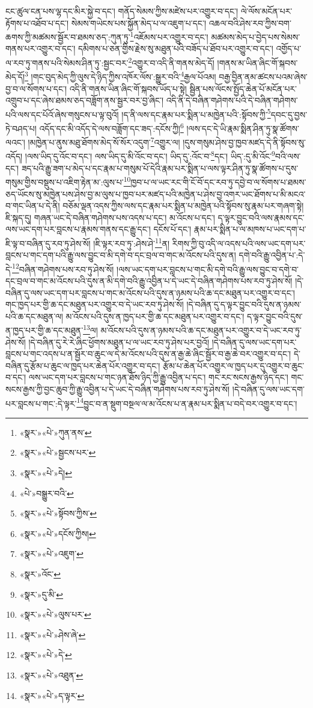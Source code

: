 ངང་ཚུལ་ངན་པས་ལྷ་དང་མིར་སྐྱེ་བ་དང་། གནོད་སེམས་ཀྱིས་མཛེས་པར་འགྱུར་བ་དང་། ལེ་ལོས་མངོན་པར་རྟོགས་པ་འཐོབ་པ་དང་། སེམས་གཡེངས་པས་སྐྱོན་མེད་པ་ལ་འཇུག་པ་དང་། འཆལ་བའི་ཤེས་རབ་ཀྱིས་བག་ཆགས་ཀྱི་མཚམས་སྦྱོར་བ་ཐམས་ཅད་:ཀུན་ཏུ་\footnote{«སྣར་»«པེ་»ཀུན་ནས་}འཇོམས་པར་འགྱུར་བ་དང་། མཚམས་མེད་པ་བྱེད་པས་སེམས་གནས་པར་འགྱུར་བ་དང་། དམིགས་པ་ཅན་གྱིས་རྗེས་སུ་མཐུན་པའི་བཟོད་པ་ཐོབ་པར་འགྱུར་བ་དང་། འགྱོད་པ་ལ་རབ་ཏུ་གནས་པའི་སེམས་ཤིན་ཏུ་:སྦྱང་བར་\footnote{«སྣར་»«པེ་»སྦྱངས་པར་}འགྱུར་བ་འདི་ནི་གནས་མེད་དོ། །གནས་མ་ཡིན་ཞིང་གོ་སྐབས་མེད་དོ།\footnote{«སྣར་»«པེ་»དེ།} །གང་བུད་མེད་ཀྱི་ལུས་དེ་ཉིད་ཀྱིས་འཁོར་ལོས་:སྒྱུར་བའི་\footnote{«པེ་»བསྒྱུར་བའི་}རྒྱལ་པོའམ། བརྒྱ་བྱིན་ནམ་ཚངས་པའམ་ཞེས་བྱ་བ་ལ་སོགས་པ་དང་། འདི་ནི་གནས་ཡིན་ཞིང་གོ་སྐབས་ཡོད་པ་སྟེ། སྦྱིན་པས་ལོངས་སྤྱོད་ཆེན་པོ་མངོན་པར་འགྲུབ་པ་དང་ཞེས་ཐམས་ཅད་བཟློག་ནས་སྦྱར་བར་བྱ་ཞིང་། འདི་ནི་དེ་བཞིན་གཤེགས་པའི་དེ་བཞིན་གཤེགས་པའི་ལས་དང་པོའོ་ཞེས་གསུངས་པ་ལྟ་བུའོ། །ད་ནི་ལས་དང་རྣམ་པར་སྨིན་པ་མཁྱེན་པའི་:སྟོབས་ཀྱི་\footnote{«སྣར་»«པེ་»སྟོབས་ཀྱིས་}དབང་དུ་བྱས་ཏེ་བཤད་པ། འདོད་དང་མི་འདོད་དེ་ལས་བཟློག་དང་ཟད་:དངོས་ཀྱི།\footnote{«སྣར་»«པེ་»དངོས་ཀྱིས།} །ལས་དང་དེ་ཡི་རྣམ་སྨིན་ཤིན་ཏུ་སྣ་ཚོགས་ལའང་། །མཁྱེན་པ་ནུས་མཐུ་ཐོགས་མེད་སོ་སོར་འདུག་\footnote{«སྣར་»«པེ་»འཇུག་}འགྱུར་ལ། །དུས་གསུམ་ཤེས་བྱ་ཁྱབ་མཛད་དེ་ནི་སྟོབས་སུ་འདོད། །ལས་ཡིད་དུ་འོང་བ་དང་། ལས་ཡིད་དུ་མི་འོང་བ་དང་། ཡིད་དུ་:འོང་བ་\footnote{«སྣར་»འོང་}དང་། ཡིད་:དུ་མི་འོང་\footnote{«སྣར་»དུ་མི་}བའི་ལས་དང་། ཟད་པའི་རྒྱུ་ཟག་པ་མེད་པ་དང་རྣམ་པ་གསུམ་པོ་དེའི་རྣམ་པར་སྨིན་པ་ལས་ལྟར་ཤིན་ཏུ་སྣ་ཚོགས་པ་དུས་གསུམ་གྱིས་བསྡུས་པ་འཇིག་རྟེན་མ་:ལུས་པ་\footnote{«སྣར་»«པེ་»ལུས་པར་}ཁྱབ་པ་ལ་ཡང་རང་གི་ངོ་བོ་དང་རབ་ཏུ་དབྱེ་བ་ལ་སོགས་པ་ཐམས་ཅད་ཡོངས་སུ་མཁྱེན་པས་ཤེས་བྱ་མ་ལུས་པ་ཁྱབ་པར་མཛད་པའི་མཁྱེན་པ་ཤེས་བྱ་འགར་ཡང་ཐོགས་པ་མི་མངའ་བ་གང་ཡིན་པ་དེ་ནི། བཅོམ་ལྡན་འདས་ཀྱིས་ལས་དང་རྣམ་པར་སྨིན་པ་མཁྱེན་པའི་སྟོབས་སུ་རྣམ་པར་གཞག་སྟེ། ཇི་སྐད་དུ། གཞན་ཡང་དེ་བཞིན་གཤེགས་པས་འདས་པ་དང་། མ་འོངས་པ་དང་། ད་ལྟར་བྱུང་བའི་ལས་རྣམས་དང་ལས་ཡང་དག་པར་བླངས་པ་རྣམས་གནས་དང་རྒྱུ་དང་། དངོས་པོ་དང་། རྣམ་པར་སྨིན་པ་ལ་མཁས་པ་ཡང་དག་པ་ཇི་ལྟ་བ་བཞིན་དུ་རབ་ཏུ་ཤེས་སོ། །ཇི་ལྟར་རབ་ཏུ་:ཤེས་ཤེ་\footnote{«སྣར་»«པེ་»ཤེས་ཞེ་}ན། རིགས་ཀྱི་བུ་འདི་ལ་འདས་པའི་ལས་ཡང་དག་པར་བླངས་པ་གང་དག་པའི་རྒྱུ་ལས་བྱུང་བ་མི་དགེ་བ་དང་བྲལ་བ་གང་མ་འོངས་པའི་དུས་ན། དགེ་བའི་རྒྱུ་འབྱིན་པ་:དེ་དེ་\footnote{«སྣར་»«པེ་»དེ་}བཞིན་གཤེགས་པས་རབ་ཏུ་ཤེས་སོ། །ལས་ཡང་དག་པར་བླངས་པ་གང་མི་དགེ་བའི་རྒྱུ་ལས་བྱུང་བ་དགེ་བ་དང་བྲལ་བ་གང་མ་འོངས་པའི་དུས་ན་མི་དགེ་བའི་རྒྱུ་འབྱིན་པ་དེ་ཡང་དེ་བཞིན་གཤེགས་པས་རབ་ཏུ་ཤེས་སོ། །དེ་བཞིན་དུ་ལས་ཡང་དག་པར་བླངས་པ་གང་མ་འོངས་པའི་དུས་ན་ཉམས་པའི་ཆ་དང་མཐུན་པར་འགྱུར་བ་དང་། གང་ཁྱད་པར་གྱི་ཆ་དང་མཐུན་པར་འགྱུར་བ་དེ་ཡང་རབ་ཏུ་ཤེས་སོ། །དེ་བཞིན་དུ་ད་ལྟར་བྱུང་བའི་དུས་ན་ཉམས་པའི་ཆ་དང་མཐུན་ལ། མ་འོངས་པའི་དུས་ན་ཁྱད་པར་གྱི་ཆ་དང་མཐུན་པར་འགྱུར་བ་དང་། ད་ལྟར་བྱུང་བའི་དུས་ན་ཁྱད་པར་གྱི་ཆ་དང་མཐུན་\footnote{«སྣར་»«པེ་»འཐུན་}ལ། མ་འོངས་པའི་དུས་ན་ཉམས་པའི་ཆ་དང་མཐུན་པར་འགྱུར་བ་དེ་ཡང་རབ་ཏུ་ཤེས་སོ། །དེ་བཞིན་དུ་རེ་རེ་ཞིང་ཕྱོགས་མཐུན་པ་ལ་ཡང་རབ་ཏུ་ཤེས་པར་བྱའོ། །དེ་བཞིན་དུ་ལས་ཡང་དག་པར་བླངས་པ་གང་འདས་པ་ན་སྦྱོར་བ་ཆུང་ལ་དེ་མ་འོངས་པའི་དུས་ན་རྒྱ་ཆེ་ཞིང་སྦྱོར་བ་རྒྱ་ཆེ་བར་འགྱུར་བ་དང་། དེ་བཞིན་དུ་རྩོམ་པ་ཆུང་ལ་ཁྱད་པར་ཆེན་པོར་འགྱུར་བ་དང་། རྩོམ་པ་ཆེན་པོར་འགྱུར་ལ་ཁྱད་པར་དུ་འགྱུར་བ་ཆུང་བ་དང་། ལས་ཡང་དག་པར་བླངས་པ་གང་ཉན་ཐོས་ཉིད་ཀྱི་རྒྱུ་འབྱིན་པ་དང་། གང་རང་སངས་རྒྱས་ཉིད་དང་། གང་སངས་རྒྱས་ཀྱི་བྱང་ཆུབ་ཀྱི་རྒྱུ་འབྱིན་པ་དེ་ཡང་དེ་བཞིན་གཤེགས་པས་རབ་ཏུ་ཤེས་སོ། །དེ་བཞིན་དུ་ལས་ཡང་དག་པར་བླངས་པ་གང་:དེ་ལྟར་\footnote{«སྣར་»«པེ་»ད་ལྟར་}བྱུང་བ་ན་སྡུག་བསྔལ་ལ་མ་འོངས་པ་ན་རྣམ་པར་སྨིན་པ་བདེ་བར་འགྱུར་བ་དང་། 